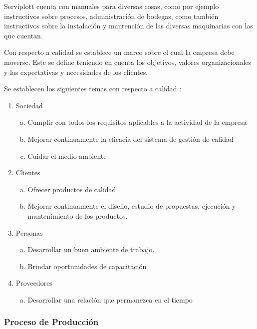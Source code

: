 		Serviplott cuenta con manuales para diversas cosas, como por ejemplo instructivos sobre procesos, administración de bodegas, como también instructivos sobre la instalación y mantención de las diversas maquinarias con las que cuentan. 		 		
		
		Con respecto a calidad se establece un marco sobre el cual la empresa debe moverse. Este se define teniendo en cuenta los objetivos, valores organizacionales y las expectativas y necesidades de los clientes.
		
		
		Se establecen los siguientes temas con respecto a calidad :
		
		\begin{enumerate}[1)]
		\item Sociedad
		  \begin{enumerate}[a)]
		  \item Cumplir con todos los requisitos aplicables a la actividad de la empresa
		  \item  Mejorar continuamente la eficacia del sistema de gestión de calidad
		  \item  Cuidar el medio ambiente
		  \end{enumerate}
		\item Clientes
		  \begin{enumerate}[a)]
		  \item Ofrecer productos de calidad
		  \item Mejorar continuamente el diseño, estudio de propuestas, ejecución y mantenimiento de los productos.
		  \end{enumerate}
		\item Personas
		  \begin{enumerate}[a)]
		  \item Desarrollar un buen ambiente de trabajo.
		  \item Brindar oportunidades de capacitación
		  \end{enumerate}
		\item Proveedores
		  \begin{enumerate}[a)]
		  \item Desarrollar una relación que permanezca en el tiempo
		  \end{enumerate}
		\end{enumerate}

	\subsubsection{Proceso de Producción}		  
	
